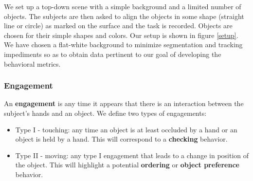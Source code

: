 \documentclass[11pt]{article}
\begin{document}
We set up a top-down scene with a simple background and a limited number of objects. The subjects are then asked to align the objects in some shape (straight line or  circle) as marked on the surface and the task is recorded. Objects are chosen for their simple shapes and colors. Our setup is shown in figure \ref{setup}. We have chosen a flat-white background to minimize segmentation and tracking impediments so as to obtain data pertinent to our goal of developing the behavioral metrics.

\subsubsection{Engagement}
An \textbf{engagement} is any time it appears that there is an interaction between the subject's hands and an object. We define two types of engagements:
\begin{itemize}
\item Type I - touching: any time an object is at least occluded by a hand or an object is held by a hand. This will correspond to a \textbf{checking} behavior.
\item Type II - moving: any type I engagement that leads to a change in position of the object. This will highlight a potential \textbf{ordering} or \textbf{object preference} behavior.
\end{itemize}
\end{document}
